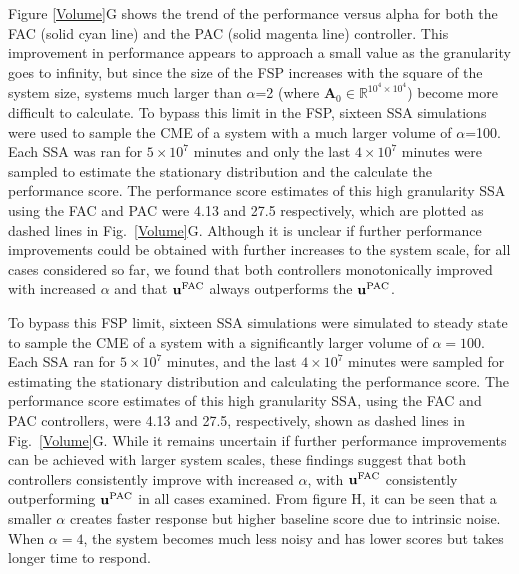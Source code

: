 \documentclass[12pt]{article}
\begin{document}
Figure \ref{Volume}G shows the trend of the performance versus alpha for both the FAC (solid cyan line) and the PAC (solid magenta line) controller. This improvement in performance appears to approach a small value as the granularity goes to infinity, but since the size of the FSP increases with the square of the system size, systems much larger than $\alpha$=2 (where $\mathbf{A}_0\in \mathbb{R}^{10^4\times10^4}$) become more difficult to calculate. 
To bypass this limit in the FSP, sixteen SSA simulations were used to sample the CME of a system with a much larger volume of $\alpha$=100. Each SSA was ran for $5\times10^7$ minutes and only the last $4\times10^7$ minutes were sampled to estimate the stationary distribution and the calculate the performance score. The performance score estimates of this high granularity SSA using the FAC and PAC were 4.13 and 27.5 respectively, which are plotted as dashed lines in Fig.\ \ref{Volume}G. Although it is unclear if further performance improvements could be obtained with further increases to the system scale, for all cases considered so far, we found that both controllers monotonically improved with increased $\alpha$ and that $\mathbf{u}^{\rm FAC}$ always outperforms the $\mathbf{u}^{\rm PAC}$. 

To bypass this FSP limit, sixteen SSA simulations were simulated to steady state to sample the CME of a system with a significantly larger volume of $\alpha = 100$. Each SSA ran for $5\times10^7$ minutes, and the last $4\times10^7$ minutes were sampled for estimating the stationary distribution and calculating the performance score. The performance score estimates of this high granularity SSA, using the FAC and PAC controllers, were 4.13 and 27.5, respectively, shown as dashed lines in Fig.\ \ref{Volume}G. While it remains uncertain if further performance improvements can be achieved with larger system scales, these findings suggest that both controllers consistently improve with increased $\alpha$, with $\mathbf{u}^{\rm FAC}$ consistently outperforming $\mathbf{u}^{\rm PAC}$ in all cases examined. From figure H, it can be seen that a smaller $\alpha$ creates faster response but higher baseline score due to intrinsic noise. When $\alpha = 4$, the system becomes much less noisy and has lower scores but takes longer time to respond. 


\end{document}
